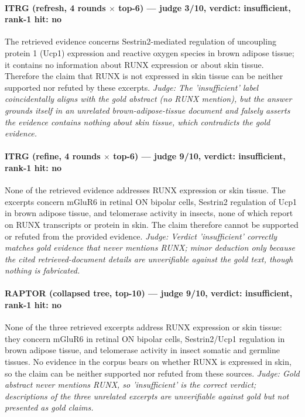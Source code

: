 \documentclass[sigconf, review, anonymous]{acmart}
\begin{document}
\paragraph{ITRG (refresh, 4 rounds $\times$ top-6) --- judge 3/10, verdict: insufficient, rank-1 hit: no}
\noindent The retrieved evidence concerns Sestrin2-mediated regulation of uncoupling protein 1 (Ucp1) expression and reactive oxygen species in brown adipose tissue; it contains no information about RUNX expression or about skin tissue. Therefore the claim that RUNX is not expressed in skin tissue can be neither supported nor refuted by these excerpts.
\noindent\small\textit{Judge: The 'insufficient' label coincidentally aligns with the gold abstract (no RUNX mention), but the answer grounds itself in an unrelated brown-adipose-tissue document and falsely asserts the evidence contains nothing about skin tissue, which contradicts the gold evidence.}
\paragraph{ITRG (refine, 4 rounds $\times$ top-6) --- judge 9/10, verdict: insufficient, rank-1 hit: no}
\noindent None of the retrieved evidence addresses RUNX expression or skin tissue. The excerpts concern mGluR6 in retinal ON bipolar cells, Sestrin2 regulation of Ucp1 in brown adipose tissue, and telomerase activity in insects, none of which report on RUNX transcripts or protein in skin. The claim therefore cannot be supported or refuted from the provided evidence.
\noindent\small\textit{Judge: Verdict 'insufficient' correctly matches gold evidence that never mentions RUNX; minor deduction only because the cited retrieved-document details are unverifiable against the gold text, though nothing is fabricated.}
\paragraph{RAPTOR (collapsed tree, top-10) --- judge 9/10, verdict: insufficient, rank-1 hit: no}
\noindent None of the three retrieved excerpts address RUNX expression or skin tissue: they concern mGluR6 in retinal ON bipolar cells, Sestrin2/Ucp1 regulation in brown adipose tissue, and telomerase activity in insect somatic and germline tissues. No evidence in the corpus bears on whether RUNX is expressed in skin, so the claim can be neither supported nor refuted from these sources.
\noindent\small\textit{Judge: Gold abstract never mentions RUNX, so 'insufficient' is the correct verdict; descriptions of the three unrelated excerpts are unverifiable against gold but not presented as gold claims.}
\end{document}
